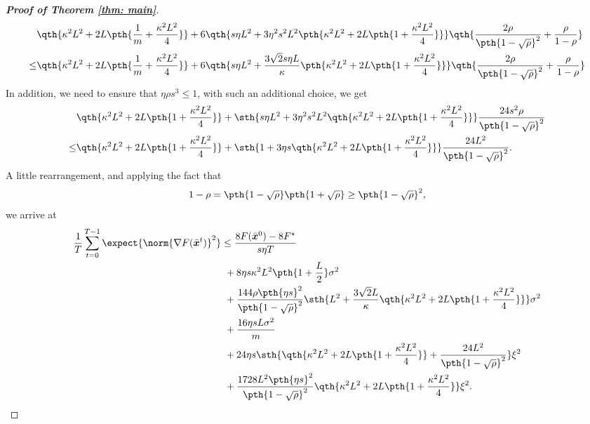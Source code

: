 \documentclass[letterpaper, 10 pt, conference]{ieeeconf}  %
\newcommand{\x}{{\bm x}}
\begin{document}
\begin{proof}[\bf Proof of Theorem \ref{thm: main}]
\begin{align*}
    &\qth{\kappa^2 L^2 + 2 L \pth{\frac{1}{m} + \frac{\kappa^2 L^2}{4}}}
+ 6 \qth{s \eta L^2 + 3\eta^2 s^2 L^2\pth{\kappa^2 L^2 + 2 L \pth{1 + \frac{\kappa^2 L^2}{4}}}} 
    \qth{\frac{2\rho }{\pth{1-\sqrt{\rho}}^2}
    + {\frac{\rho }{1-\rho} }} \\
   \le & \qth{\kappa^2 L^2 + 2 L \pth{\frac{1}{m} + \frac{\kappa^2 L^2}{4}}}
+ 6 \qth{s\eta L^2 + \frac{3\sqrt{2} s \eta  L}{\kappa}  \pth{\kappa^2 L^2 + 2 L \pth{1 + \frac{\kappa^2 L^2}{4}}}} 
    \qth{\frac{2\rho }{\pth{1-\sqrt{\rho}}^2}
    + {\frac{\rho }{1-\rho} }} 
\end{align*}
In addition, we need to ensure that $\eta \rho s^3\le 1$, with such an additional choice, we get 
\begin{align*}
&\qth{\kappa^2 L^2 + 2 L \pth{1 + \frac{\kappa^2 L^2}{4}}}
+ \sth{s \eta L^2 + 3\eta^2 s^2 L^2\qth{\kappa^2 L^2 + 2 L \pth{1 + \frac{\kappa^2 L^2}{4}}}}\frac{24 s^2 \rho}{\pth{1-\sqrt{\rho}}^2}\\
\le & \qth{\kappa^2 L^2 + 2 L \pth{1 + \frac{\kappa^2 L^2}{4}}}
+ \sth{1 + 3\eta s \qth{\kappa^2 L^2 + 2 L \pth{1 + \frac{\kappa^2 L^2}{4}}}}\frac{24 L^2}{\pth{1-\sqrt{\rho}}^2}.
\end{align*}
A little rearrangement, and applying the fact that
\[
1 - \rho = \pth{1 - \sqrt{\rho }}\pth{1 + \sqrt{\rho}} \ge \pth{1 - \sqrt{\rho }}^2, 
\]
 we arrive at
\begin{align*}
\frac{1}{T}\sum_{t=0}^{T-1}\expect{\norm{\nabla F(\bar{\x}^t)}^2} 
& \le \frac{8F(\bar{\x}^0) - 8 F^\star }{s \eta T} \\
&~+ 8 \eta s \kappa^2 L^2
\pth{1 + \frac{L}{2}} 
 \sigma^2\\ 
&~+ \frac{144  \rho \pth{\eta s }^2  }{\pth{1-\sqrt{\rho}}^2}   \sth{ L^2 + \frac{3\sqrt{2} L}{\kappa}  \qth{\kappa^2 L^2 + 2 L \pth{1 + \frac{\kappa^2 L^2}{4}}}}\sigma^2 \\
&~ +  \frac{16 \eta s L \sigma^2}{m}\\
&~+ 24 \eta s \sth{
\qth{\kappa^2 L^2 + 2 L \pth{1 + \frac{\kappa^2 L^2}{4}}}
+ \frac{24 L^2}{\pth{1-\sqrt{\rho}}^2}
} \xi^2\\
&~ + \frac{1728 L^2 \pth{\eta s }^2}{\pth{1-\sqrt{\rho}}^2}\qth{\kappa^2 L^2 + 2 L \pth{1 + \frac{\kappa^2 L^2}{4}}} \xi^2.
\end{align*}


\end{proof}
\end{document}
